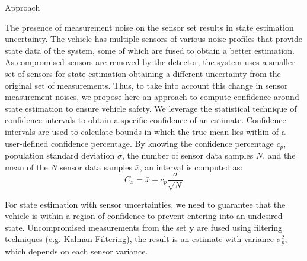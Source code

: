 \begin{section}{Approach}
\label{sec:estimation_confidence}

The presence of measurement noise on the sensor set results in state estimation uncertainty. The vehicle has multiple sensors of various noise profiles that provide state data of the system, some of which are fused to obtain a better estimation. As compromised sensors are removed by the detector, the system uses a smaller set of sensors for state estimation obtaining a different uncertainty from the original set of measurements. Thus, to take into account this change in sensor measurement noises, we propose here an approach to compute confidence around state estimation to ensure vehicle safety. 
We leverage the statistical technique of confidence intervals \cite{devore2011probability} to obtain a specific confidence of an estimate. Confidence intervals are used to calculate bounds in which the true mean lies within of a user-defined confidence percentage. By knowing the confidence percentage $c_p$, population standard deviation $\sigma$, the number of sensor data samples $N$, and the mean of the $N$ sensor data samples $\bar{x}$, an interval is computed as:
    \begin{equation}
     \label{Confidence_interval}
		C_x = \bar{x} + c_p\frac{\sigma}{\sqrt{N}}
	\end{equation}
	
	
For state estimation with sensor uncertainties, we need to guarantee that the vehicle is within a region of confidence to prevent entering into an undesired state. Uncompromised measurements from the set $\bm{y}$ are fused using filtering techniques (e.g. Kalman Filtering), the result is an estimate with variance $\sigma_p^2$, which depends on each sensor variance. 


\end{section}
